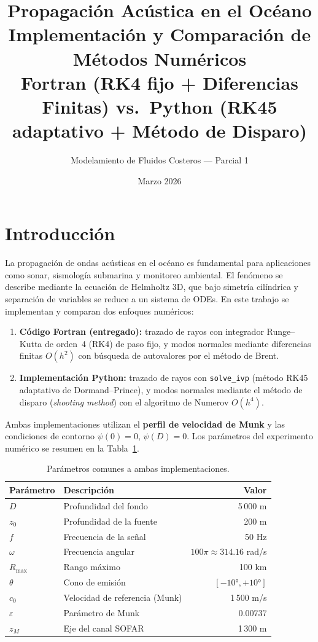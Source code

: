 \documentclass[12pt,a4paper]{article}
\title{\textbf{Propagación Acústica en el Océano}\\[0.4em]
       \large Implementación y Comparación de Métodos Numéricos\\
       \large Fortran (RK4 fijo + Diferencias Finitas) vs.\
                Python (RK45 adaptativo + Método de Disparo)}
\author{Modelamiento de Fluidos Costeros — Parcial 1}
\date{Marzo 2026}
\begin{document}
\maketitle
\tableofcontents
\newpage

\section{Introducción}

La propagación de ondas acústicas en el océano es fundamental para aplicaciones
como sonar, sismología submarina y monitoreo ambiental. El fenómeno se describe
mediante la ecuación de Helmholtz 3D, que bajo simetría cilíndrica y separación
de variables se reduce a un sistema de ODEs. En este trabajo se implementan y
comparan dos enfoques numéricos:

\begin{enumerate}
  \item \textbf{Código Fortran (entregado):} trazado de rayos con integrador
        Runge--Kutta de orden~4 (RK4) de paso fijo, y modos normales mediante
        diferencias finitas $O(h^2)$ con búsqueda de autovalores por el método
        de Brent.
  \item \textbf{Implementación Python:} trazado de rayos con \texttt{solve\_ivp}
        (método RK45 adaptativo de Dormand--Prince), y modos normales mediante
        el método de disparo (\emph{shooting method}) con el algoritmo de
        Numerov $O(h^4)$.
\end{enumerate}

Ambas implementaciones utilizan el \textbf{perfil de velocidad de Munk}
y las condiciones de contorno $\psi(0)=0$, $\psi(D)=0$.
Los parámetros del experimento numérico se resumen en la
Tabla~\ref{tab:parametros}.

\begin{table}[H]
\centering
\caption{Parámetros comunes a ambas implementaciones.}
\label{tab:parametros}
\begin{tabular}{llr}
\toprule
Parámetro & Descripción & Valor \\
\midrule
$D$      & Profundidad del fondo         & 5\,000 m \\
$z_0$    & Profundidad de la fuente       & 200 m \\
$f$      & Frecuencia de la señal         & 50 Hz \\
$\omega$ & Frecuencia angular             & $100\pi \approx 314.16$ rad/s \\
$R_{\max}$& Rango máximo                  & 100 km \\
$\theta$ & Cono de emisión               & $[-10°,+10°]$ \\
$c_0$    & Velocidad de referencia (Munk) & 1\,500 m/s \\
$\varepsilon$ & Parámetro de Munk         & 0.00737 \\
$z_M$    & Eje del canal SOFAR            & 1\,300 m \\
\bottomrule
\end{tabular}
\end{table}
\end{document}
